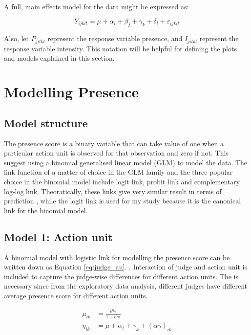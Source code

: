 \documentclass{monashthesis}
\begin{document}
A full, main effects model for the data might be expressed as:

\[Y_{ijklt} = \mu + \alpha_i + \beta_j + \gamma_k + \delta_l + \varepsilon_{ijklt}\]

\noindent Also, let \(P_{jitkl}\) represent the response variable presence, and \(I_{jitkl}\) represent the response variable intensity. This notation will be helpful for defining the plots and models explained in this section.

\hypertarget{modelling-presence}{%
\section{Modelling Presence}\label{modelling-presence}}

\hypertarget{model-structure}{%
\subsection{Model structure}\label{model-structure}}

The presence score is a binary variable that can take value of one when a particular action unit is observed for that observation and zero if not. This suggest using a binomial generalised linear model (GLM) to model the data. The link function of a matter of choice in the GLM family and the three popular choice in the binomial model include logit link, probit link and complementary log-log link. Theoratically, these links give very similar result in terms of prediction \textcite{faraway2016extending}, while the logit link is used for my study because it is the canonical link for the binomial model.

\hypertarget{model-1-action-unit}{%
\subsection{Model 1: Action unit}\label{model-1-action-unit}}

A binomial model with logistic link for modelling the presence score can be written down as Equation \ref{eq:judge_au}. . Interaction of judge and action unit is included to capture the judge-wise differences for different action units. The is necessary since from the exploratory data analysis, different judges have different average presence score for different action units.

\begin{align}\label{eq:judge_au}
\mu_{ik} &= \frac{e^{\eta_{ik}}}{1 + e^{\eta_{ik}}} \\
\eta_{ik} &= \mu + \alpha_i + \gamma_k + (\alpha\gamma)_{ik}
\end{align}
\end{document}
